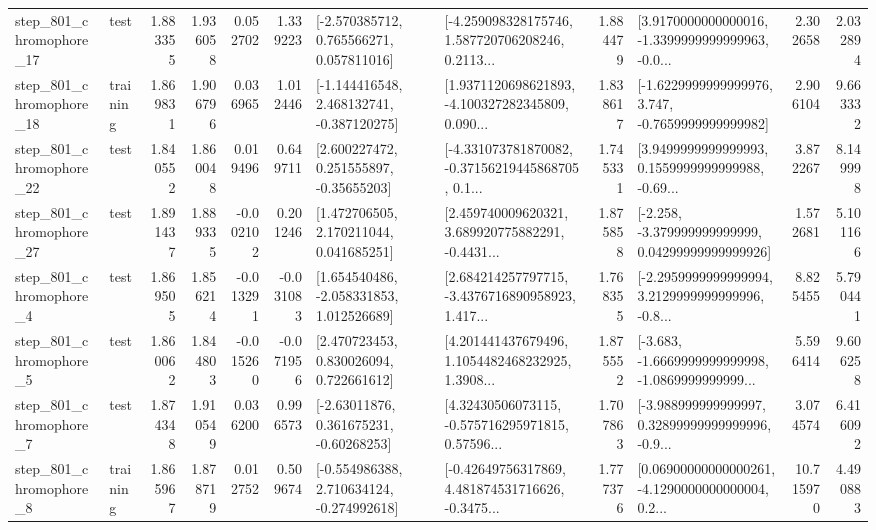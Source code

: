 \begin{tabular}{llrrrrllrlrr}
  step\_801\_chromophore\_17 &      test &      1.883355 &    1.936058 &      0.052702 &  1.339223 &    [-2.570385712, 0.765566271, 0.057811016] &  [-4.259098328175746, 1.587720706208246, 0.2113... &       1.884479 &  [3.9170000000000016, -1.3399999999999963, -0.0... &            2.302658 &          2.032894 \\
  step\_801\_chromophore\_18 &  training &      1.869831 &    1.906796 &      0.036965 &  1.012446 &   [-1.144416548, 2.468132741, -0.387120275] &  [1.9371120698621893, -4.100327282345809, 0.090... &       1.838617 &  [-1.6229999999999976, 3.747, -0.7659999999999982] &            2.906104 &          9.663332 \\
  step\_801\_chromophore\_22 &      test &      1.840552 &    1.860048 &      0.019496 &  0.649711 &     [2.600227472, 0.251555897, -0.35655203] &  [-4.331073781870082, -0.37156219445868705, 0.1... &       1.745331 &  [3.9499999999999993, 0.1559999999999988, -0.69... &            3.872267 &          8.149998 \\
  step\_801\_chromophore\_27 &      test &      1.891437 &    1.889335 &     -0.002102 &  0.201246 &     [1.472706505, 2.170211044, 0.041685251] &  [2.459740009620321, 3.689920775882291, -0.4431... &       1.875858 &  [-2.258, -3.379999999999999, 0.04299999999999926] &            1.572681 &          5.101166 \\
   step\_801\_chromophore\_4 &      test &      1.869505 &    1.856214 &     -0.013291 & -0.031083 &    [1.654540486, -2.058331853, 1.012526689] &  [2.684214257797715, -3.4376716890958923, 1.417... &       1.768355 &  [-2.2959999999999994, 3.2129999999999996, -0.8... &            8.825455 &          5.790441 \\
   step\_801\_chromophore\_5 &      test &      1.860062 &    1.844803 &     -0.015260 & -0.071956 &     [2.470723453, 0.830026094, 0.722661612] &  [4.201441437679496, 1.1054482468232925, 1.3908... &       1.875552 &  [-3.683, -1.6669999999999998, -1.0869999999999... &            5.596414 &          9.606258 \\
   step\_801\_chromophore\_7 &      test &      1.874348 &    1.910549 &      0.036200 &  0.996573 &     [-2.63011876, 0.361675231, -0.60268253] &  [4.32430506073115, -0.575716295971815, 0.57596... &       1.707863 &  [-3.988999999999997, 0.32899999999999996, -0.9... &            3.074574 &          6.416092 \\
   step\_801\_chromophore\_8 &  training &      1.865967 &    1.878719 &      0.012752 &  0.509674 &   [-0.554986388, 2.710634124, -0.274992618] &  [-0.42649756317869, 4.481874531716626, -0.3475... &       1.777376 &  [0.06900000000000261, -4.1290000000000004, 0.2... &           10.715970 &          4.490883 \\

\end{tabular}
